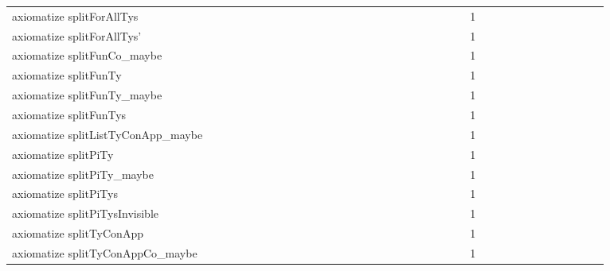 {\begin{tabular}{l|rrr|rrr|rrr}
axiomatize splitForAllTys &  &  &  &  &  &  &  &  &  &  &  &  &  &  &  &  &  &  &  &  &  &  &  & 1 &  &  &  &  &  &  &  &  &  &  &  & \\
axiomatize splitForAllTys' &  &  &  &  &  &  &  &  &  &  &  &  &  &  &  &  &  &  &  &  &  &  &  & 1 &  &  &  &  &  &  &  &  &  &  &  & \\
axiomatize splitFunCo_maybe &  &  &  &  &  &  &  &  &  &  &  &  &  &  &  &  &  &  &  &  &  &  &  & 1 &  &  &  &  &  &  &  &  &  &  &  & \\
axiomatize splitFunTy &  &  &  &  &  &  &  &  &  &  &  &  &  &  &  &  &  &  &  &  &  &  &  & 1 &  &  &  &  &  &  &  &  &  &  &  & \\
axiomatize splitFunTy_maybe &  &  &  &  &  &  &  &  &  &  &  &  &  &  &  &  &  &  &  &  &  &  &  & 1 &  &  &  &  &  &  &  &  &  &  &  & \\
axiomatize splitFunTys &  &  &  &  &  &  &  &  &  &  &  &  &  &  &  &  &  &  &  &  &  &  &  & 1 &  &  &  &  &  &  &  &  &  &  &  & \\
axiomatize splitListTyConApp_maybe &  &  &  &  &  &  &  &  &  &  &  &  &  &  &  &  &  &  &  &  &  &  &  & 1 &  &  &  &  &  &  &  &  &  &  &  & \\
axiomatize splitPiTy &  &  &  &  &  &  &  &  &  &  &  &  &  &  &  &  &  &  &  &  &  &  &  & 1 &  &  &  &  &  &  &  &  &  &  &  & \\
axiomatize splitPiTy_maybe &  &  &  &  &  &  &  &  &  &  &  &  &  &  &  &  &  &  &  &  &  &  &  & 1 &  &  &  &  &  &  &  &  &  &  &  & \\
axiomatize splitPiTys &  &  &  &  &  &  &  &  &  &  &  &  &  &  &  &  &  &  &  &  &  &  &  & 1 &  &  &  &  &  &  &  &  &  &  &  & \\
axiomatize splitPiTysInvisible &  &  &  &  &  &  &  &  &  &  &  &  &  &  &  &  &  &  &  &  &  &  &  & 1 &  &  &  &  &  &  &  &  &  &  &  & \\
axiomatize splitTyConApp &  &  &  &  &  &  &  &  &  &  &  &  &  &  &  &  &  &  &  &  &  &  &  & 1 &  &  &  &  &  &  &  &  &  &  &  & \\
axiomatize splitTyConAppCo_maybe &  &  &  &  &  &  &  &  &  &  &  &  &  &  &  &  &  &  &  &  &  &  &  & 1 &  &  &  &  &  &  &  &  &  &  &  & \\

\end{tabular}}
